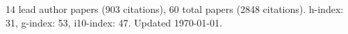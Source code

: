 14 lead author papers (903 citations),
60 total papers (2848 citations).\newline
h-index: 31, g-index: 53, i10-index: 47. Updated \today.
